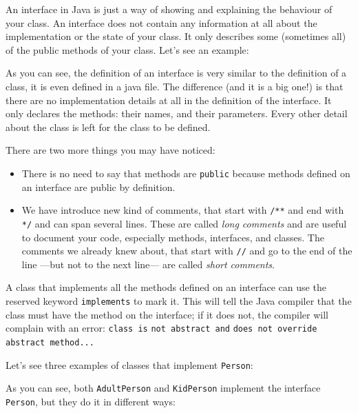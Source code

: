 An interface in Java is just a way of showing and explaining the
behaviour of your class. An interface does not contain any information
at all about the implementation or the state of your class. It only
describes some (sometimes all) of the public methods of your
class. Let's see an example: 


As you can see, the definition of an interface is very similar to the
definition of a class, it is even defined in a java file. 
The difference (and it is a big one!) is that
there are no implementation details at all in the definition of the
interface. It only declares the methods: their names, and their
parameters. Every other detail about the class is left for the class
to be defined. 

There are two more things you may have noticed: 

\begin{itemize}
\item There is no need to say that methods are \verb+public+
  because methods defined on an interface are public by definition.
\item We have introduce new kind of comments, that start with
  \verb+/**+ and end with \verb+*/+ and can span several lines. These
  are called \emph{long comments} and are useful to document your
  code, especially methods, interfaces, and classes. The comments we
  already knew about, that start with \verb+//+ and go to the end of
  the line ---but not to the next line--- are called \emph{short
    comments}. 
\end{itemize}

A class that implements all the methods defined on an interface can
use the reserved keyword \verb+implements+ to mark it. This will tell
the Java compiler that the class must have the method on the
interface; if it does not, the compiler will complain with an error:
\verb+class is+ \verb+not abstract and+ \verb+does not override+
\verb+abstract method...+ 

Let's see three examples of classes that implement \verb+Person+:



As you can see, both \verb+AdultPerson+ and \verb+KidPerson+ implement
the interface \verb+Person+, but they do it in different ways: 

